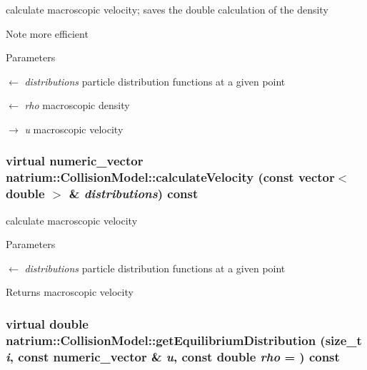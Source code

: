 calculate macroscopic velocity; saves the double calculation of the density \begin{DoxyNote}{Note}
more efficient 
\end{DoxyNote}

\begin{DoxyParams}{Parameters}
\item[\mbox{$\leftarrow$} {\em distributions}]particle distribution functions at a given point \item[\mbox{$\leftarrow$} {\em rho}]macroscopic density \item[\mbox{$\rightarrow$} {\em u}]macroscopic velocity \end{DoxyParams}
\hypertarget{classnatrium_1_1CollisionModel_a90428f4c29916641de3de872803dde0f}{
\subsubsection[{calculateVelocity}]{\setlength{\rightskip}{0pt plus 5cm}virtual {\bf numeric\_\-vector} natrium::CollisionModel::calculateVelocity (const vector$<$ double $>$ \& {\em distributions}) const}}
\label{classnatrium_1_1CollisionModel_a90428f4c29916641de3de872803dde0f}


calculate macroscopic velocity 
\begin{DoxyParams}{Parameters}
\item[\mbox{$\leftarrow$} {\em distributions}]particle distribution functions at a given point \end{DoxyParams}
\begin{DoxyReturn}{Returns}
macroscopic velocity 
\end{DoxyReturn}
\hypertarget{classnatrium_1_1CollisionModel_a88b382d63da80e950bc58e8afad769a6}{
\subsubsection[{getEquilibriumDistribution}]{\setlength{\rightskip}{0pt plus 5cm}virtual double natrium::CollisionModel::getEquilibriumDistribution (size\_\-t {\em i}, \/  const {\bf numeric\_\-vector} \& {\em u}, \/  const double {\em rho} = {}) const}}
\label{classnatrium_1_1CollisionModel_a88b382d63da80e950bc58e8afad769a6}


